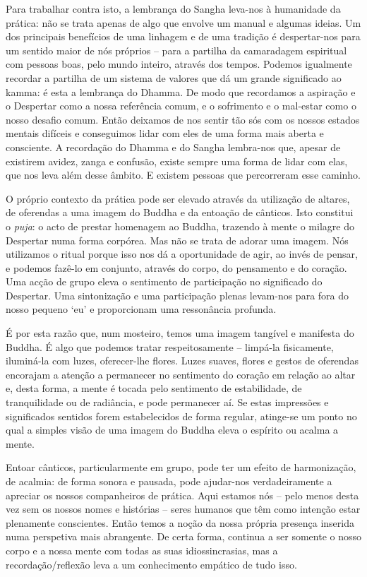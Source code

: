 Para trabalhar contra isto, a lembrança do Sangha leva-nos à humanidade da
prática: não se trata apenas de algo que envolve um manual e algumas ideias. Um
dos principais benefícios de uma linhagem e de uma tradição é despertar-nos para
um sentido maior de nós próprios -- para a partilha da camaradagem espiritual
com pessoas boas, pelo mundo inteiro, através dos tempos. Podemos igualmente
recordar a partilha de um sistema de valores que dá um grande significado ao
kamma: é esta a lembrança do Dhamma. De modo que recordamos a aspiração e o
Despertar como a nossa referência comum, e o sofrimento e o mal-estar como o
nosso desafio comum. Então deixamos de nos sentir tão sós com os nossos estados
mentais difíceis e conseguimos lidar com eles de uma forma mais aberta e
consciente. A recordação do Dhamma e do Sangha lembra-nos que, apesar de
existirem avidez, zanga e confusão, existe sempre uma forma de lidar com elas,
que nos leva além desse âmbito. E existem pessoas que percorreram esse caminho.

O próprio contexto da prática pode ser elevado através da utilização de altares,
de oferendas a uma imagem do Buddha e da entoação de cânticos. Isto constitui o
\emph{puja}: o acto de prestar homenagem ao Buddha, trazendo à mente o milagre
do Despertar numa forma corpórea. Mas não se trata de adorar uma imagem. Nós
utilizamos o ritual porque isso nos dá a oportunidade de agir, ao invés de
pensar, e podemos fazê-lo em conjunto, através do corpo, do pensamento e do
coração. Uma acção de grupo eleva o sentimento de participação no significado do
Despertar. Uma sintonização e uma participação plenas levam-nos para fora do
nosso pequeno `eu' e proporcionam uma ressonância profunda.

É por esta razão que, num mosteiro, temos uma imagem tangível e manifesta do
Buddha. É algo que podemos tratar respeitosamente -- limpá-la fisicamente,
iluminá-la com luzes, oferecer-lhe flores. Luzes suaves, flores e gestos de
oferendas encorajam a atenção a permanecer no sentimento do coração em relação
ao altar e, desta forma, a mente é tocada pelo sentimento de estabilidade, de
tranquilidade ou de radiância, e pode permanecer aí. Se estas impressões e
significados sentidos forem estabelecidos de forma regular, atinge-se um ponto
no qual a simples visão de uma imagem do Buddha eleva o espírito ou acalma a
mente.

Entoar cânticos, particularmente em grupo, pode ter um efeito de harmonização,
de acalmia: de forma sonora e pausada, pode ajudar-nos verdadeiramente a
apreciar os nossos companheiros de prática. Aqui estamos nós -- pelo menos desta
vez sem os nossos nomes e histórias -- seres humanos que têm como intenção estar
plenamente conscientes. Então temos a noção da nossa própria presença inserida
numa perspetiva mais abrangente. De certa forma, continua a ser somente o nosso
corpo e a nossa mente com todas as suas idiossincrasias, mas a
recordação/reflexão leva a um conhecimento empático de tudo isso.

